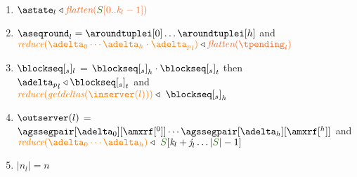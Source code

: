 \begin{definition}
\begin{enumerate}
	\item \label{prop_state_known} $\astate_l \triangleleft \flatten {\queuemessage[0 .. \tknown_l - 1]}$
	\item \label{prop_pending} $\pending_l = \aroundtuplei[0]\ldots\aroundtuplei[h]$ and $\ireduce{\adelta_0\cdots\adelta_h\cdot {\pushbuffer}_l} \triangleleft \flatten{\tpending_l}$
	\item \label{prop_send} $\tsent_l$ = ${\tsent}_h \cdot {\tsent}_t $ then $ {\pushbuffer}_l \triangleleft {\tsent}_t$ and $\ireduce{\igetdeltas{\inserver(l)}} \triangleleft \ {\tsent}_h$

\item \label{prop_outserver2} $\outserver(l)$ = $\agssegpair[\adelta_0][{\amxrf[^{0}]}]\cdots\agssegpair[\adelta_h][{\amxrf[^{h}]}]$ and $\ireduce{\adelta_0\cdots\adelta_h}\triangleleft \ \queuemessage[\tknown_l + \treceivebuffer_l \ldots  |\queuemessage| - 1]$

\item \label{prop_size_buffersent} $|n_l| = n$ 
	

\end{enumerate}
 
	
	
\end{definition}

